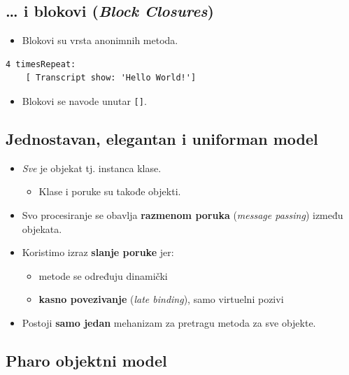 \documentclass[presentation]{beamer}
\begin{document}
\subsection{\ldots{} i blokovi (\emph{Block Closures})}
\label{sec:orge90eb0c}

\begin{itemize}
\item Blokovi su vrsta anonimnih metoda.
\end{itemize}

\begin{verbatim}
4 timesRepeat:
    [ Transcript show: 'Hello World!']
\end{verbatim}

\begin{itemize}
\item Blokovi se navode unutar \texttt{[]}.
\end{itemize}

\subsection{Jednostavan, elegantan i uniforman model}
\label{sec:org8257906}

\begin{itemize}
\item \emph{Sve} je objekat tj. instanca klase.
\begin{itemize}
\item Klase i poruke su takođe objekti.
\end{itemize}
\item Svo procesiranje se obavlja \textbf{\textbf{razmenom poruka}} (\emph{message passing}) između
objekata.

\item Koristimo izraz \textbf{\textbf{slanje poruke}} jer:
\begin{itemize}
\item metode se određuju dinamički
\item \textbf{\textbf{kasno povezivanje}} (\emph{late binding}), samo virtuelni pozivi
\end{itemize}

\item Postoji \textbf{\textbf{samo jedan}} mehanizam za pretragu metoda za sve objekte.
\end{itemize}

\subsection{Pharo objektni model}
\label{sec:org9484f8d}
\end{document}
